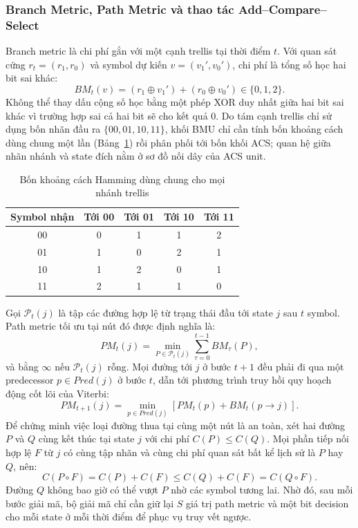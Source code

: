 \documentclass[12pt,a4paper]{article}
\renewcommand{\_}{\originalunderscore\allowbreak}
\begin{document}
\subsubsection{Branch Metric, Path Metric và thao tác Add--Compare--Select}
Branch metric là chi phí gắn với một cạnh trellis tại thời điểm $t$. Với quan sát cứng $r_t=(r_1,r_0)$ và symbol dự kiến $v=(v_1',v_0')$, chi phí là tổng số học hai bit sai khác:
\begin{equation}
BM_t(v)=(r_1\oplus v_1')+(r_0\oplus v_0')\in\{0,1,2\}.
\end{equation}
Không thể thay dấu cộng số học bằng một phép XOR duy nhất giữa hai bit sai khác vì trường hợp sai cả hai bit sẽ cho kết quả 0. Do tám cạnh trellis chỉ sử dụng bốn nhãn đầu ra $\{00,01,10,11\}$, khối BMU chỉ cần tính bốn khoảng cách dùng chung một lần (Bảng~\ref{tab:theory-bm4}) rồi phân phối tới bốn khối ACS; quan hệ giữa nhãn nhánh và state đích nằm ở sơ đồ nối dây của ACS unit.

\begin{table}[H]\centering\small
\begin{tabular}{ccccc}\toprule
\textbf{Symbol nhận}&\textbf{Tới 00}&\textbf{Tới 01}&\textbf{Tới 10}&\textbf{Tới 11}\\\midrule
00&0&1&1&2\\01&1&0&2&1\\10&1&2&0&1\\11&2&1&1&0\\\bottomrule
\end{tabular}
\caption{Bốn khoảng cách Hamming dùng chung cho mọi nhánh trellis}\label{tab:theory-bm4}
\end{table}

Gọi $\mathcal P_t(j)$ là tập các đường hợp lệ từ trạng thái đầu tới state $j$ sau $t$ symbol. Path metric tối ưu tại nút đó được định nghĩa là:
\begin{equation}
PM_t(j)=\min_{P\in\mathcal P_t(j)}\sum_{\tau=0}^{t-1}BM_\tau(P),
\end{equation}
và bằng $\infty$ nếu $\mathcal P_t(j)$ rỗng. Mọi đường tới $j$ ở bước $t+1$ đều phải đi qua một predecessor $p\in Pred(j)$ ở bước $t$, dẫn tới phương trình truy hồi quy hoạch động cốt lõi của Viterbi:
\begin{equation}
PM_{t+1}(j)=\min_{p\in Pred(j)}\left[PM_t(p)+BM_t(p\rightarrow j)\right].
\end{equation}
Để chứng minh việc loại đường thua tại cùng một nút là an toàn, xét hai đường $P$ và $Q$ cùng kết thúc tại state $j$ với chi phí $C(P)\le C(Q)$. Mọi phần tiếp nối hợp lệ $F$ từ $j$ có cùng tập nhãn và cùng chi phí quan sát bất kể lịch sử là $P$ hay $Q$, nên:
\begin{equation}
C(P\circ F)=C(P)+C(F)\le C(Q)+C(F)=C(Q\circ F).
\end{equation}
Đường $Q$ không bao giờ có thể vượt $P$ nhờ các symbol tương lai. Nhờ đó, sau mỗi bước giải mã, bộ giải mã chỉ cần giữ lại $S$ giá trị path metric và một bit decision cho mỗi state ở mỗi thời điểm để phục vụ truy vết ngược.
\end{document}

